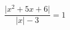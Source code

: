 \begin{ex}[type=equation]
	\begin{condition}
	$\dfrac{\big | x^2+5x + 6\big|}{\big|x\big| - 3} = 1$
	\end{condition}
	\answer{$\varnothing$}
\end{ex}